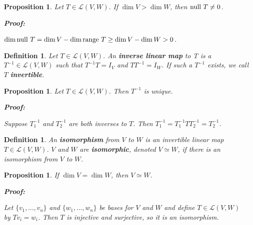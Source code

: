 \documentclass{article}
\theoremstyle{colontheorem}
\newtheorem{proposition}[theorem]{Proposition}
\newtheorem{definition}[theorem]{Definition}
\newcommand{\Null}{\textnormal{null }}
\newcommand{\Range}{\textnormal{range }}
\newenvironment{Proposition}
{
	\begin{mdframed}[backgroundcolor=PropPink!10]
	\begin{proposition}
}
{
	\end{proposition}
	\end{mdframed}
	
	\vspace{.15in}
}
\newenvironment{Def}
{
	\begin{mdframed}[backgroundcolor=DefGreen!10]
	\begin{definition}
}
{
	\end{definition}
	\end{mdframed}
	
	\vspace{.15in}
}
\newenvironment{Proof}
{
	\begin{mdframed}[backgroundcolor=ProofPurple!10]
	\textbf{Proof:}%
}
{
	\end{mdframed}
	
	\vspace{.085in}
}
\begin{document}
\begin{Proposition}
	
	Let $T \in \mathcal{L}(V,W)$. If $\dim V > \dim W$, then $\Null T \neq 0$.
	
	\begin{Proof}
		$\dim \Null T = \dim V - \dim \Range T \geq \dim V - \dim W > 0$.
		
	\end{Proof}
	
\end{Proposition}



\begin{Def}
	
	Let $T \in \mathcal{L}(V,W)$. An \textbf{inverse linear map} to T is a $T^{-1} \in \mathcal{L}(V,W)$ such that $T^{-1}T = I_V$ and $TT^{-1} = I_W$. If such a $T^{-1}$ exists, we call $T$ \textbf{invertible}.
	
\end{Def}



\begin{Proposition}
	
	Let $T \in \mathcal{L}(V,W)$. Then $T^{-1}$ is unique.
	
	\begin{Proof}
		Suppose $T^{-1}_1$ and $T^{-1}_2$ are both inverses to $T$. Then $T^{-1}_1 = T^{-1}_1 T T^{-1}_2 = T^{-1}_2$.
		
	\end{Proof}
	
\end{Proposition}



\begin{Def}
	
	An \textbf{isomorphism} from $V$ to $W$ is an invertible linear map $T \in \mathcal{L}(V,W)$. $V$ and $W$ are \textbf{isomorphic}, denoted $V \simeq W$, if there is an isomorphism from $V$ to $W$.
	
\end{Def}



\begin{Proposition}
	
	If $\dim V = \dim W$, then $V \simeq W$.
	
	\begin{Proof}
		Let $\{v_1, ..., v_n\}$ and $\{w_1, ..., w_n\}$ be bases for $V$ and $W$ and define $T \in \mathcal{L}(V,W)$ by $Tv_i = w_i$. Then $T$ is injective and surjective, so it is an isomorphism.
		
	\end{Proof}
	
\end{Proposition}
\end{document}
